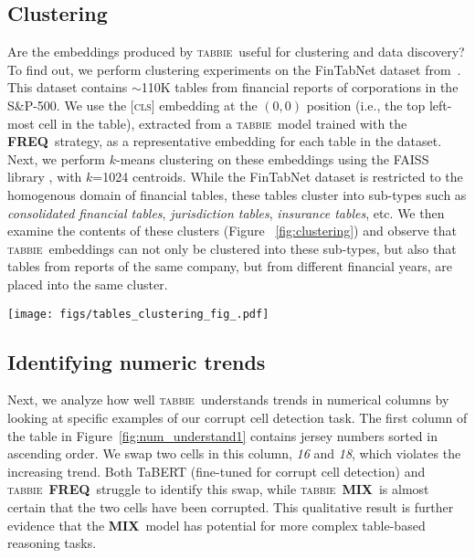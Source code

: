 \documentclass[11pt]{article}
\newcommand{\name}[0]{\textsc{tabbie}}
\newcommand{\freq}[0]{\textbf{FREQ}}
\newcommand{\mix}[0]{\textbf{MIX}}
\begin{document}
\subsection{Clustering}
Are the embeddings produced by \name\ useful for clustering and data discovery? To find out, we perform clustering experiments on the FinTabNet dataset from~\citet{Zheng_2021_WACV}. This dataset contains 	$\sim$110K tables from financial reports of corporations in the S\&P-500. We use the \textsc{[cls]} embedding at the $(0, 0)$ position (i.e., the top left-most cell in the table), extracted from a \name\ model trained with the  \freq\ strategy, as a representative embedding for each table in the dataset. Next, we perform $k$-means clustering on these embeddings using the FAISS library \cite{faissJDH17}, with $k$=1024 centroids. While the FinTabNet dataset is restricted to the homogenous domain of financial tables, these tables cluster into sub-types such as \emph{consolidated financial tables}, \emph{jurisdiction tables}, \emph{insurance tables}, etc. We then examine the contents of these clusters (Figure ~\ref{fig:clustering}) and observe that \name\ embeddings can not only be clustered into these sub-types, but also that tables from reports of the same company, but from different financial years, are placed into the same cluster. 
\makeatother
\begin{figure*}[t]
 \centering
  \texttt{[image: figs/tables\_clustering\_fig\_.pdf]}
  \caption{Sample tables from clusters obtained by running $k$-means on \name's \textsc{[cls]} embeddings on the FinTabNet dataset.  \name\ not only clusters embeddings  into reasonable semantic types, such as \emph{Table of Contents} (first row), but it also places tables of the same type from the same company into the same cluster (second and third rows). We provide the source images of the corresponding tables in this figure. }
  \label{fig:clustering}
\end{figure*} 
\subsection{Identifying numeric trends}
Next, we analyze how well \name\ understands trends in numerical columns by looking at specific examples of our corrupt cell detection task. The first column of the table in Figure~\ref{fig:num_understand1} contains jersey numbers sorted in ascending order. We swap two cells in this column, \emph{16} and \emph{18}, which violates the increasing trend. Both TaBERT (fine-tuned for corrupt cell detection) and \name\ \freq\ struggle to identify this swap, while \name\ \mix\ is almost certain that the two cells have been corrupted. This qualitative result is further evidence that the \mix\ model has potential for more complex table-based reasoning tasks. 
\end{document}
